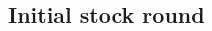 \documentclass{article}
\begin{document}
\begin{CJK}{UTF8}{min}







\section{Initial stock round}


\end{CJK}
\end{document}
